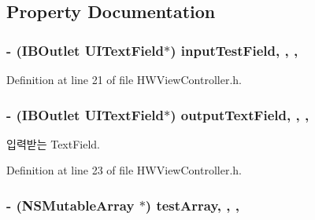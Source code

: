 \subsection{Property Documentation}
\hypertarget{interface_h_w_view_controller_a18a1f92002714422be85e23e7257d6ac}{
\subsubsection[{input\-Test\-Field}]{\setlength{\rightskip}{0pt plus 5cm}-\/ (I\-B\-Outlet U\-I\-Text\-Field$\ast$) input\-Test\-Field\hspace{0.3cm}{\ttfamily [read]}, {\ttfamily [write]}, {\ttfamily [nonatomic]}, {\ttfamily [strong]}}}\label{interface_h_w_view_controller_a18a1f92002714422be85e23e7257d6ac}


Definition at line 21 of file H\-W\-View\-Controller.\-h.

\hypertarget{interface_h_w_view_controller_afe4853256be255795cd235f795b100da}{
\subsubsection[{output\-Text\-Field}]{\setlength{\rightskip}{0pt plus 5cm}-\/ (I\-B\-Outlet U\-I\-Text\-Field$\ast$) output\-Text\-Field\hspace{0.3cm}{\ttfamily [read]}, {\ttfamily [write]}, {\ttfamily [nonatomic]}, {\ttfamily [strong]}}}\label{interface_h_w_view_controller_afe4853256be255795cd235f795b100da}


입력받는 Text\-Field. 



Definition at line 23 of file H\-W\-View\-Controller.\-h.

\hypertarget{interface_h_w_view_controller_af8916c3750591d42ce991b5f237f955c}{
\subsubsection[{test\-Array}]{\setlength{\rightskip}{0pt plus 5cm}-\/ (N\-S\-Mutable\-Array $\ast$) test\-Array\hspace{0.3cm}{\ttfamily [read]}, {\ttfamily [write]}, {\ttfamily [nonatomic]}, {\ttfamily [strong]}}}\label{interface_h_w_view_controller_af8916c3750591d42ce991b5f237f955c}


